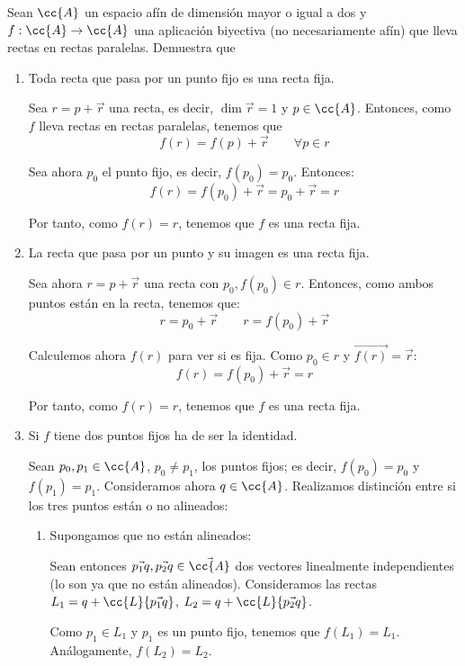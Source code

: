 \begin{ejercicio}
    Sean $\cc{A}$ un espacio afín de dimensión mayor o igual a dos y $f : \cc{A} \to \cc{A}$ una aplicación biyectiva (no necesariamente afín) que lleva rectas en rectas paralelas. Demuestra que
    \begin{enumerate}
        \item Toda recta que pasa por un punto fijo es una recta fija.

        Sea $r=p+\vec{r}$ una recta, es decir, $\dim \vec{r}=1$ y $p\in \cc{A}$. Entonces, como $f$ lleva rectas en rectas paralelas, tenemos que $$f(r)=f(p)+\vec{r} \qquad \forall p\in r$$

        Sea ahora $p_0$ el punto fijo, es decir, $f(p_0)=p_0$. Entonces:
        $$f(r)=f(p_0)+\vec{r}=p_0+\vec{r}=r$$

        Por tanto, como $f(r)=r$, tenemos que $f$ es una recta fija.

        
        \item La recta que pasa por un punto y su imagen es una recta fija.

        Sea ahora $r=p+\vec{r}$ una recta con $p_0,f(p_0)\in r$. Entonces, como ambos puntos están en la recta, tenemos que:
        $$r=p_0+\vec{r} \qquad r=f(p_0)+\vec{r}$$

        Calculemos ahora $f(r)$ para ver si es fija. Como $p_0\in r$ y $\vec{f(r)}=\vec{r}$:
        \begin{equation*}
            f(r)=f(p_0)+\vec{r}=r
        \end{equation*}

        Por tanto, como $f(r)=r$, tenemos que $f$ es una recta fija.
        
        \item Si $f$ tiene dos puntos fijos ha de ser la identidad.

        Sean $p_0,p_1\in \cc{A}$, $p_0\neq p_1$, los puntos fijos; es decir, $f(p_0)=p_0$ y $f(p_1)=p_1$. Consideramos ahora $q\in \cc{A}$. Realizamos distinción entre si los tres puntos están o no alineados:
        \begin{enumerate}
            \item Supongamos que no están alineados:

            Sean entonces $\vec{p_1q}, \vec{p_2q}\in \vec{\cc{A}}$ dos vectores linealmente independientes (lo son ya que no están alineados). Consideramos las rectas $L_1 = q+\cc{L}\{\vec{p_1q}\}$, $L_2 = q+\cc{L}\{\vec{p_2q}\}$.

            Como $p_1\in L_1$ y $p_1$ es un punto fijo, tenemos que $f(L_1)=L_1$. Análogamente, $f(L_2)=L_2$.


\end{enumerate}
\end{enumerate}
\end{ejercicio}
